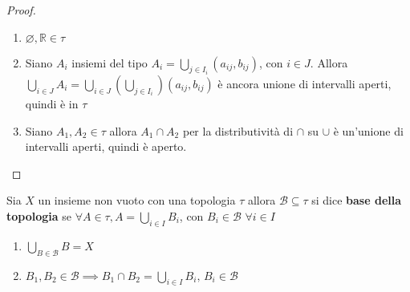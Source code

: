\begin{proof}
\begin{enumerate}[label = \arabic*)]
    \item \(\varnothing, \mathbb{R} \in \tau\) 
    \item Siano \(A_{i}\) insiemi del tipo \(A_{i} = \bigcup_{j \in  I_{i}}
        (a_{ij}, b_{ij})\), con \(i \in J\). Allora \(\bigcup_{i \in  J}A_{i} =
        \bigcup_{i \in  J}(\bigcup_{j \in I_{i}} ) (a_{ij}, b_{ij})\) è ancora
        unione di intervalli aperti, quindi è in \(\tau\) 
    \item Siano \(A_{1}, A_{2} \in \tau\) allora \(A_{1} \cap A_{2}\) per la
        distributività di \(\cap \) su \(\cup \) è un'unione di intervalli
        aperti, quindi è aperto.
\end{enumerate}

\end{proof}

\begin{definition}
    Sia \(X\) un insieme non vuoto con una topologia \(\tau\) allora
    \(\mathcal{B} \subseteq 
    \tau\) si dice \textbf{base della topologia} se \(\forall A \in \tau, A =
    \bigcup_{i \in  I} B_{i}\), con \(B_{i} \in \mathcal{B}\,\,\forall i \in I\) 

\end{definition}
\begin{note}
\begin{enumerate}[label = \arabic*)]
    Quindi se \(\mathcal{B}\) è base di una topologia se e solo se
    \item \(\bigcup_{B \in \mathcal{B}} B = X\) 
    \item \(B_{1}, B_{2} \in \mathcal{B} \implies B_{1} \cap  B_{2} = \bigcup_{i \in I}
        B_{i}, \, B_{i} \in \mathcal{B}\) 
\end{enumerate}
\end{note}


